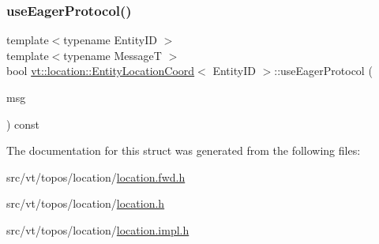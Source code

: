 \mbox{\label{structvt_1_1location_1_1_entity_location_coord_a5d41b90c998e6de566868868c9cc4ba1}} 
\subsubsection{\texorpdfstring{use\+Eager\+Protocol()}{useEagerProtocol()}}
{\footnotesize\ttfamily template$<$typename Entity\+ID $>$ \\
template$<$typename MessageT $>$ \\
bool \hyperlink{structvt_1_1location_1_1_entity_location_coord}{vt\+::location\+::\+Entity\+Location\+Coord}$<$ Entity\+ID $>$\+::use\+Eager\+Protocol (\begin{DoxyParamCaption}\item[{\hyperlink{namespacevt_ab2b3d506ec8e8d1540aede826d84a239}{Msg\+Shared\+Ptr}$<$ MessageT $>$}]{msg }\end{DoxyParamCaption}) const}



The documentation for this struct was generated from the following files\+:\begin{DoxyCompactItemize}
\item 
src/vt/topos/location/\hyperlink{location_8fwd_8h}{location.\+fwd.\+h}\item 
src/vt/topos/location/\hyperlink{location_8h}{location.\+h}\item 
src/vt/topos/location/\hyperlink{location_8impl_8h}{location.\+impl.\+h}\end{DoxyCompactItemize}
